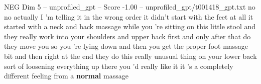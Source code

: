 \begin{textsample}{NEG Dim 5 – unprofiled\_gpt – Score -1.00 – unprofiled\_gpt/t001418\_gpt.txt}  \label{ex:f5_neg_005}
no no actually I ’m telling it in the wrong order it didn't start with the feet at all it started with a neck and back massage while you ’re sitting on this little stool and they really work into your shoulders and upper back first and only after that do they move you so you ’re lying down and then you get the proper foot massage bit and then right at the end they do this really unusual thing on your lower back sort of loosening everything up there you ’d really like it it ’s a completely different feeling from a \textbf{normal} massage

\end{textsample}
